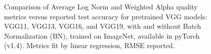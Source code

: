 \begin{figure}[t]
    \centering
    \qquad
    \qquad
    \qquad
    \caption{Comparison of Average Log Norm and Weighted Alpha quality metrics versus reported test accuracy for pretrained VGG models: 
             VGG11, VGG13, VGG16, and VGG19, with and without Batch Normalization (BN),
             trained on ImageNet, available in pyTorch (v1.4).  
             Metrics fit by linear regression, RMSE reported.  }
    \label{fig:vgg-metrics}
\end{figure}


